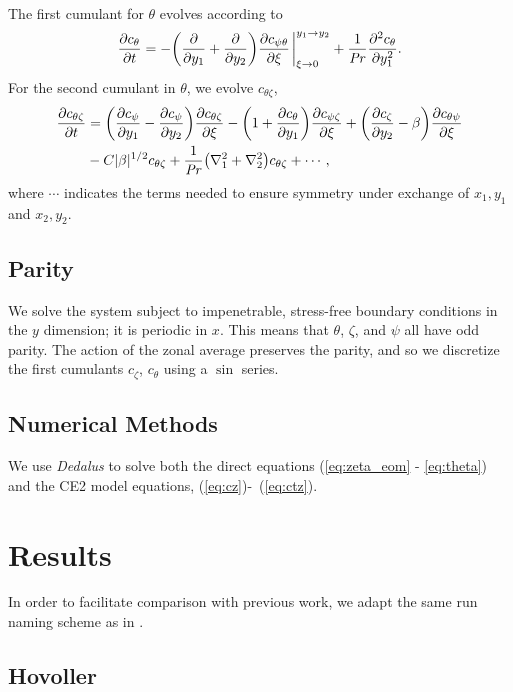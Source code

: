 \documentclass{jfm}
\newcommand{\cz}{c_{\zeta}}
\newcommand{\cs}{c_{\psi}}
\newcommand{\ct}{c_{\theta}}
\newcommand{\csz}{c_{\psi \zeta}}
\newcommand{\ctz}{c_{\theta \zeta}}
\newcommand{\cst}{c_{\psi \theta}}
\newcommand{\cts}{c_{\theta \psi}}
\begin{document}
The first cumulant for $\theta$ evolves according to
\begin{equation}
  \label{eq:ct}
  \pdv{\ct}{t} = - \qty(\pdv{y_1} + \pdv{y_2}) \pdv{\cst}{\xi} \eval_{\xi \to 0}^{y_1 \to y_2} + \frac{1}{\Pran} \pdv[2]{\ct}{y_1}.
\end{equation}
For the second cumulant in $\theta$, we evolve $\ctz$,
\begin{equation}
  \label{eq:ctz}
  \begin{split}
    \pdv{\ctz}{t} &= \qty(\pdv{\cs}{y_1} - \pdv{\cs}{y_2}) \pdv{\ctz}{\xi} - \qty(1 + \pdv{\ct}{y_1}) \pdv{\csz}{\xi} + \qty(\pdv{\cz}{y_2} - \beta) \pdv{\cts}{\xi}\\
    &  - C |\beta|^{1/2} \ctz + \frac{1}{\Pran}\qty(\nabla_1^2 + \nabla_2^2) \ctz + \cdots,    
  \end{split}
\end{equation}
where $\cdots$ indicates the terms needed to ensure symmetry under exchange of $x_1, y_1$ and $x_2, y_2$.

\subsection{Parity}
\label{sec:parity}

We solve the system subject to impenetrable, stress-free boundary conditions in the $y$ dimension; it is periodic in $x$. 
This means that $\theta$, $\zeta$, and $\psi$ all have odd parity.
The action of the zonal average preserves the parity, and so we discretize the first cumulants $\cz$, $\ct$ using a $\sin$ series. 

\subsection{Numerical Methods}
\label{sec:numerical}

We use \emph{Dedalus} to solve both the direct equations (\ref{eq:zeta_eom} - \ref{eq:theta}) and the CE2 model equations, (\ref{eq:cz})-~(\ref{eq:ctz}).


\section{Results}
\label{sec:results}

In order to facilitate comparison with previous work, we adapt the same run naming scheme as in \citet{2018RSPSA.47480422T}.

\subsection{Hovoller}
\label{sec:hov}
\end{document}
